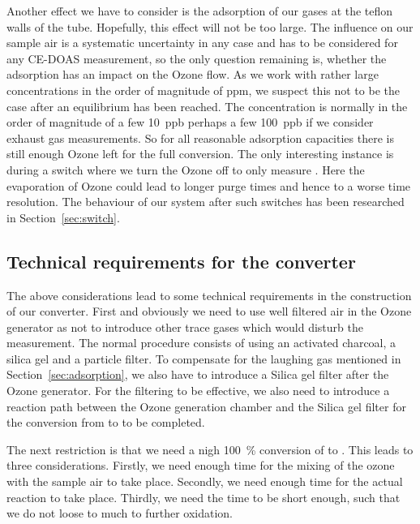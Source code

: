 Another effect we have to consider is the adsorption of our gases at
the teflon walls of the tube. Hopefully, this effect will not be too
large. The influence on our sample air is a systematic uncertainty in
any case and has to be considered for any CE-DOAS measurement, so the
only question remaining is, whether the adsorption has an impact on
the Ozone flow. As we work with rather large concentrations in the
order of magnitude of \si{ppm}, we suspect this not to be the case
after an equilibrium has been reached. The  concentration is
normally in the order of magnitude of a few \SI{10}{ppb} perhaps a few
\SI{100}{ppb} if we consider exhaust gas measurements. So for all
reasonable adsorption capacities there is still enough Ozone left for
the full conversion. The only interesting instance is during a switch
where we turn the Ozone off to only measure . Here the
evaporation of Ozone could lead to longer purge times and hence to a
worse time resolution. The behaviour of our system after such switches
has been researched in Section~\ref{sec:switch}.

\subsection{Technical requirements for the converter}
\label{sec:requirements}

The above considerations lead to some technical requirements in the
construction of our converter. First and obviously we need to use well
filtered air in the Ozone generator as not to introduce other trace
gases which would disturb the measurement. The normal procedure
consists of using an activated charcoal, a silica gel and a particle
filter. To compensate for the laughing gas mentioned in
Section~\ref{sec:adsorption}, we also have to introduce a Silica gel
filter after the Ozone generator. For the filtering to be effective,
we also need to introduce a reaction path between the Ozone generation
chamber and the Silica gel filter for the conversion from  to
 to be completed.

The next restriction is that we need a nigh \SI{100}{\%} conversion of
 to . This leads to three considerations. Firstly, we
need enough time for the mixing of the ozone with the sample air to
take place. Secondly, we need enough time for the actual reaction to
take place. Thirdly, we need the time to be short enough, such that we
do not loose to much  to further oxidation.

